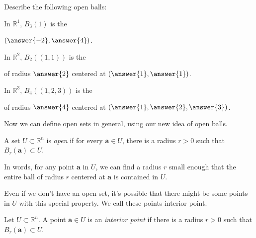\documentclass{ximera}
\begin{document}
\begin{example}
Describe the following open balls:

In $\mathbb{R}^1$, $B_3(1)$ is the 
\begin{multipleChoice}
\end{multipleChoice}
 $(\answer{-2},\answer{4})$.
 
 In $\mathbb{R}^2$, $B_2((1,1))$ is the
 \begin{multipleChoice}
\end{multipleChoice}
of radius $\answer{2}$ centered at $(\answer{1}, \answer{1})$.

In $\mathbb{R}^3$, $B_4((1,2,3))$ is the
\begin{multipleChoice}
\end{multipleChoice}
of radius $\answer{4}$ centered at $(\answer{1}, \answer{2}, \answer{3})$.
\end{example}

Now we can define open sets in general, using our new idea of open balls.

\begin{definition}
A set $U\subset \mathbb{R}^n$ is \emph{open} if for every $\mathbf{a}\in U$, there is a radius $r>0$ such that $B_r(\mathbf{a})\subset U$.
\end{definition}

In words, for any point $\mathbf{a}$ in $U$, we can find a radius $r$ small enough that the entire ball of radius $r$ centered at $\mathbf{a}$ is contained in $U$.


Even if we don't have an open set, it's possible that there might be some points in $U$ with this special property. We call these points interior point.

\begin{definition}
Let $U\subset \mathbb{R}^n$. A point $\mathbf{a}\in U$ is an \emph{interior point} if there is a radius $r>0$ such that $B_r(\mathbf{a})\subset U$.
\end{definition}
\end{document}
